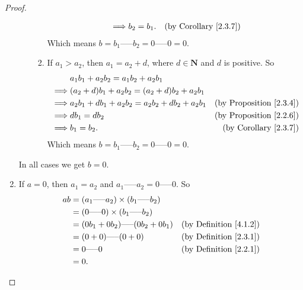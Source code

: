 \begin{proof}
\begin{enumerate}
\begin{enumerate}[label=(\roman*)]
\begin{enumerate}[label=(\arabic*)]
\begin{align*}
                                      \implies & b_2 = b_1.                                      & \text{(by Corollary \ref{2.3.7})}
                                  \end{align*}
                                  Which means \(b = b_1 \text{-----} b_2 = 0 \text{-----} 0 = 0\).
                            \item If \(a_1 > a_2\), then \(a_1 = a_2 + d\), where \(d \in \mathbf{N}\) and \(d\) is positive.
                                  So
                                  \begin{align*}
                                               & a_1b_1 + a_2b_2 = a_1b_2 + a_2b_1                                                     \\
                                      \implies & (a_2 + d)b_1 + a_2b_2 = (a_2 + d)b_2 + a_2b_1                                         \\
                                      \implies & a_2b_1 + db_1 + a_2b_2 = a_2b_2 + db_2 + a_2b_1 & \text{(by Proposition \ref{2.3.4})} \\
                                      \implies & db_1 = db_2                                     & \text{(by Proposition \ref{2.2.6})} \\
                                      \implies & b_1 = b_2.                                      & \text{(by Corollary \ref{2.3.7})}
                                  \end{align*}
                                  Which means \(b = b_1 \text{-----} b_2 = 0 \text{-----} 0 = 0\).
                        \end{enumerate}
              \end{enumerate}
              In all cases we get \(b = 0\).
        \item If \(a = 0\), then \(a_1 = a_2\) and \(a_1 \text{-----} a_2 = 0 \text{-----} 0\).
              So
              \begin{align*}
                  ab & = (a_1 \text{-----} a_2) \times (b_1 \text{-----} b_2)                                      \\
                     & = (0 \text{-----} 0) \times (b_1 \text{-----} b_2)                                          \\
                     & = (0b_1 + 0b_2) \text{-----} (0b_2 + 0b_1)             & \text{(by Definition \ref{4.1.2})} \\
                     & = (0 + 0) \text{-----} (0 + 0)                         & \text{(by Definition \ref{2.3.1})} \\
                     & = 0 \text{-----} 0                                     & \text{(by Definition \ref{2.2.1})} \\
                     & = 0.
              \end{align*}
    \end{enumerate}
\end{proof}


